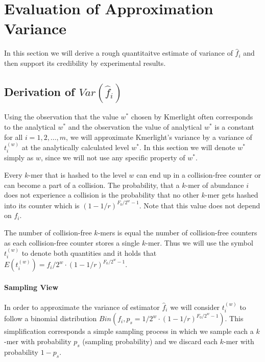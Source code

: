 \section{Evaluation of Approximation Variance}
\label{sec:estimation-variance}

In this section we will derive a rough quantitaitve estimate of variance of $ \hat f_i$
and then support its credibility by experimental results.

\subsection{Derivation of $Var(\hat f_i)$}
Using the observation that the value $w^*$ chosen by Kmerlight often corresponds
to the analytical $w^*$ and the observation the value of analytical $w^*$ is a constant
for all $i=1, 2, \dots, m$, we will approximate Kmerlight's variance by a variance
of $t_i^{(w)}$ at the analytically calculated level $w^*$. In this section we will denote
$w^*$ simply as $w$, since we will not use any specific property of $w^*$.

Every $k$-mer that is hashed to the level $w$ can end up 
in a collision-free counter or can become a part of a collision.
The probability, that a $k$-mer of abundance $i$ does not experience a collision is
the probability that no other $k$-mer gets hashed into its counter which is
$(1 - 1/r)^{F_0/2^w-1}$. Note that this value does not depend on $f_i$.

The number of collision-free $k$-mers is equal the number of collision-free counters
as each collision-free counter stores a single $k$-mer. Thus we will use the symbol
$t_i^{(w)}$ to denote both quantities and it holds that 
$E(t_i^{(w)}) = f_i/2^w \cdot (1 - 1/r)^{F_0/2^w-1}$.

% 

\paragraph{Sampling View}
In order to approximate the variance of estimator $\hat f_i$ we will consider
$t_i^{(w)}$ to follow a binomial distribution $Bin(f_i, p_s = 1/2^w \cdot (1 - 1/r)^{F_0/2^w-1})$.
This simplification corresponds a simple sampling process in which we sample each a $k$-mer
with probability $p_s$ (sampling probability) and we discard each $k$-mer
with probability $1 - p_s$.

